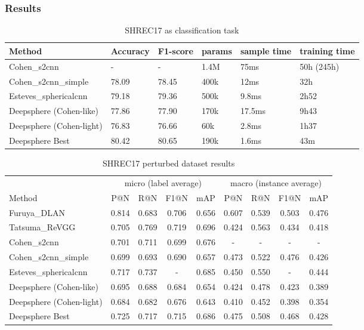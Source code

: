 \documentclass[11pt]{report}
\begin{document}
\subsubsection{Results}
\begin{table}[ht]
    \centering
    \begin{tabular}{l|l l|l l l}
        Method & Accuracy & F1-score & params & sample time & training time \\ \hline
        Cohen\_s2cnn & - & - & 1.4M & 75ms & 50h (245h)\\
        Cohen\_s2cnn\_simple & 78.09 & 78.45 & 400k & 12ms & 32h\\
        Esteves\_sphericalcnn & 79.18 & 79.36 & 500k & 9.8ms & 2h52\\ \hline
        Deepsphere (Cohen-like) & 77.86 & 77.90 & 170k & 17.5ms & 9h43\\
        Deepsphere (Cohen-light) & 76.83 & 76.66 & 60k & 2.8ms & 1h37\\
        Deepsphere Best & 80.42 & 80.65 & 190k & 1.6ms & 43m
    \end{tabular}
    \caption{SHREC17 as classification task}
    \label{tab:SHREC17_class}
\end{table}

\begin{table}[ht]
    \centering
    \begin{tabular}{l|c c c c|c c c c}
         & \multicolumn{4}{c|}{micro (label average)} & \multicolumn{4}{c}{macro (instance average)} \\
        Method & P@N & R@N & F1@N & mAP & P@N & R@N & F1@N & mAP \\ \hline
        Furuya\_DLAN & 0.814 & 0.683 & 0.706 & 0.656 & 0.607 & 0.539 & 0.503 & 0.476 \\
        Tatsuma\_ReVGG & 0.705 & 0.769 & 0.719 & 0.696 & 0.424 & 0.563 & 0.434 & 0.418\\ \hline
        Cohen\_s2cnn & 0.701 & 0.711 & 0.699 & 0.676 & - & - & - & - \\
        Cohen\_s2cnn\_simple & 0.699 & 0.693 & 0.690 & 0.657 & 0.473 & 0.522 & 0.476 & 0.426\\
        Esteves\_sphericalcnn & 0.717 & 0.737 & - & 0.685 & 0.450 & 0.550 & - & 0.444\\ \hline
        Deepsphere (Cohen-like) & 0.695 & 0.688 & 0.684 & 0.654 & 0.424 & 0.478 & 0.423 & 0.389\\
        Deepsphere (Cohen-light) & 0.684 & 0.682 & 0.676 & 0.643 & 0.410 & 0.452 & 0.398 & 0.354 \\
        Deepsphere Best & 0.725 & 0.717 & 0.715 & 0.686 & 0.475 & 0.508 & 0.468 & 0.428
    \end{tabular}
    \caption{SHREC17 perturbed dataset results}
    \label{tab:SHREC17_retriev}
\end{table}
\end{document}
